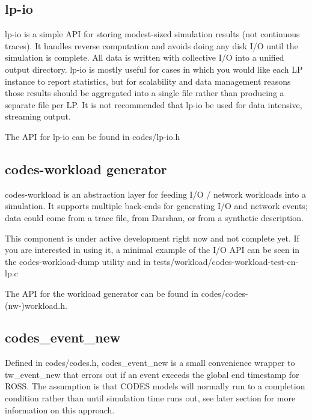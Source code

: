 \documentclass[conference,10pt,compsocconf,onecolumn]{IEEEtran}
\begin{document}
\subsection{lp-io}

lp-io is a simple API for storing modest-sized
simulation results (not continuous traces).  It handles reverse computation
and avoids doing any disk I/O until the simulation is complete. All data is
written with collective I/O into a unified output directory. lp-io is
mostly useful for cases in which you would like each LP instance to report
statistics, but for scalability and data management reasons those results
should be aggregated into a single file rather than producing a separate
file per LP. It is not recommended that lp-io be used for data intensive,
streaming output.

The API for lp-io can be found in codes/lp-io.h


\subsection{codes-workload generator}

codes-workload is an abstraction layer for feeding I/O / network
workloads into a simulation. It supports multiple back-ends for generating
I/O and network events; data could come from a trace file, from Darshan, or from a
synthetic description.

This component is under active development right now and not complete yet.  If
you are interested in using it, a minimal example of the I/O API can be seen in
the codes-workload-dump utility and in
tests/workload/codes-workload-test-cn-lp.c

The API for the workload generator can be found in codes/codes-(nw-)workload.h.

\subsection{codes\_event\_new}

Defined in codes/codes.h, codes\_event\_new is a small convenience wrapper to
tw\_event\_new that errors out if an event exceeds the global end timestamp for
ROSS. The assumption is that CODES models will normally run to a completion
condition rather than until simulation time runs out, see later section for
more information on this approach.
\end{document}
